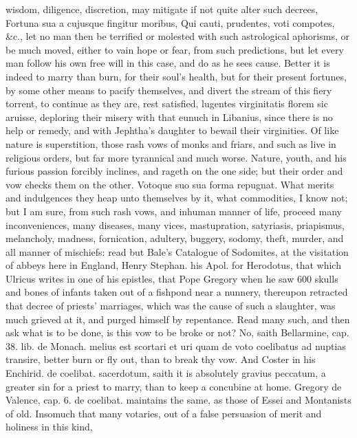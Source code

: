 {wisdom, diligence, discretion, may mitigate if not quite alter such
decrees, Fortuna sua a cujusque fingitur moribus, Qui cauti,
prudentes, voti compotes, \&c., let no man then be terrified or molested
with such astrological aphorisms, or be much moved, either to vain hope
or fear, from such predictions, but let every man follow his own free
will in this case, and do as he sees cause. Better it is indeed to
marry than burn, for their soul's health, but for their present
fortunes, by some other means to pacify themselves, and divert the
stream of this fiery torrent, to continue as they are, rest
satisfied, lugentes virginitatis florem sic aruisse, deploring their
misery with that eunuch in Libanius, since there is no help or remedy,
and with Jephtha's daughter to bewail their virginities.
Of like nature is superstition, those rash vows of monks and friars,
and such as live in religious orders, but far more tyrannical and much
worse. Nature, youth, and his furious passion forcibly inclines, and
rageth on the one side; but their order and vow checks them on the
other. Votoque suo sua forma repugnat. What merits and
indulgences they heap unto themselves by it, what commodities, I know
not; but I am sure, from such rash vows, and inhuman manner of life,
proceed many inconveniences, many diseases, many vices, mastupration,
satyriasis, priapismus, melancholy, madness, fornication,
adultery, buggery, sodomy, theft, murder, and all manner of mischiefs:
read but Bale's Catalogue of Sodomites, at the visitation of abbeys
here in England, Henry Stephan. his Apol. for Herodotus, that which
Ulricus writes in one of his epistles, that Pope Gregory when he
saw 600 skulls and bones of infants taken out of a fishpond near a
nunnery, thereupon retracted that decree of priests' marriages, which
was the cause of such a slaughter, was much grieved at it, and purged
himself by repentance. Read many such, and then ask what is to be done,
is this vow to be broke or not? No, saith Bellarmine, cap. 38. lib. de
Monach. melius est scortari et uri quam de voto coelibatus ad nuptias
transire, better burn or fly out, than to break thy vow. And Coster in
his Enchirid. de coelibat. sacerdotum, saith it is absolutely gravius
peccatum, a greater sin for a priest to marry, than to keep a
concubine at home. Gregory de Valence, cap. 6. de coelibat. maintains
the same, as those of Essei and Montanists of old. Insomuch that many
votaries, out of a false persuasion of merit and holiness in this kind,
}
